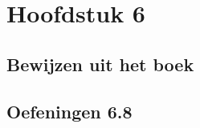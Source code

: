 \documentclass[lineaire_algebra_oplossingen.tex]{subfiles}
\begin{document}
\chapter{Hoofdstuk 6}

\section{Bewijzen uit het boek}


\section{Oefeningen 6.8}
\end{document}
